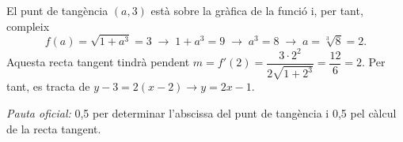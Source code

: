 \begin{apartats}
\begin{solucio}
El punt de tangència $(a,3)$ està sobre la gràfica de la funció i, per tant, compleix
\[
f(a)=\sqrt{1+a^3}=3\;\rightarrow\;1+a^3=9\;\rightarrow\;a^3=8\;\rightarrow\;a=\sqrt[3]{8}=2 .
\]
Aquesta recta tangent tindrà pendent $m=f'(2)=\dfrac{3\cdot2^2}{2\sqrt{1+2^3}}=\dfrac{12}{6}=2$. Per tant,
es tracta de $y-3=2(x-2)\rightarrow y=2x-1$.

\textit{Pauta oficial:} 0,5 per determinar l'abscissa del punt de tangència i 0,5 pel càlcul de la recta
tangent.
\end{solucio}

\end{apartats}
